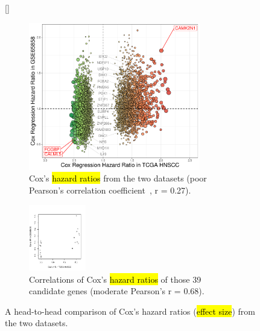 \documentclass[
paper=landscape,
paper=160mm:90mm, %
fontsize=11pt, %
pagesize, %
parskip=half-, %
]{scrartcl} %
\theoremstyle{mythmstyle} %
\begin{document}
%
\thispagestyle{headings}

\begin{figure}[ht]

[\FBwidth]
{%
    
    \begin{subfigure}[c]{0.5\textwidth}
    \includegraphics[width=7.5cm]{RplotH2H_TCGA_GSE65858_CoxHR.pdf}
    \caption{Cox's \hl{hazard ratios} from the two datasets (poor Pearson's correlation coefficient{\tiny ~\autocite{Schober2018}}, r = 0.27).}
    \end{subfigure}
    \begin{subfigure}[t]{0.15\textwidth}
    \includegraphics[width=2.5cm]{Rplot20_correlation_TCGA_GSE65858_CoxHR.pdf}
    \caption{Correlations of Cox's \hl{hazard ratios} of those 39 candidate genes (moderate Pearson's r = 0.68).}
    \end{subfigure}    
}   
{\captionsetup{labelformat=empty}    
\caption{A head-to-head comparison of Cox's hazard ratios (\hl{effect size}) from the two datasets. %
}}
\end{figure}
\end{document}
